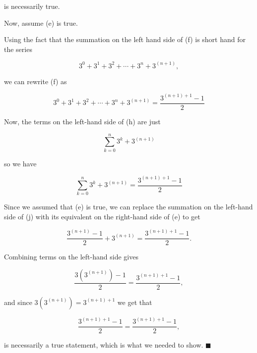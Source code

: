 \documentclass{article}
\begin{document}
is necessarily true.

Now, assume (e) is true.

Using the fact that the summation on the left hand side of (f) is short hand for the series

\[ \tag{g} 3^0 + 3^1 + 3^2 + \cdots + 3^n + 3^{(n+1)}, \]

we can rewrite (f) as

\[ \tag{h} 3^0 + 3^1 + 3^2 + \cdots + 3^n + 3^{(n+1)} = \frac{3^{(n+1)+1} - 1}{2} \]

Now, the terms on the left-hand side of (h) are just

\[ \tag{i} \sum_{k=0}^n 3^k + 3^{(n+1)} \]

so we have 

\[ \tag{j} \sum_{k=0}^n 3^k + 3^{(n+1)} = \frac{3^{(n+1)+1} - 1}{2} \]

Since we assumed that (e) is true, we can replace the summation on the left-hand side of (j) with its equivalent on the right-hand side of (e) to get

\[ \tag{k} \frac{3^{(n+1)} - 1}{2} + 3^{(n+1)} = \frac{3^{(n+1)+1} - 1}{2}. \]
 
Combining terms on the left-hand side gives

\[ \tag{l} \frac{3(3^{(n+1)}) - 1}{2} = \frac{3^{(n+1)+1} - 1}{2}, \]

and since $3(3^{(n+1)}) = 3^{(n+1)+1}$ we get that

\[ \tag{m} \frac{3^{(n+1)+1} - 1}{2} = \frac{3^{(n+1)+1} - 1}{2}, \]

is necessarily a true statement, which is what we needed to show. $\blacksquare$
\end{document}
